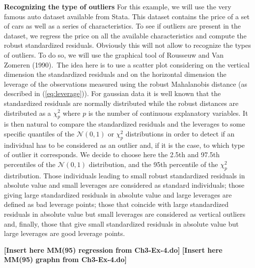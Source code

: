 \begin{stexample}
\textbf{Recognizing the type of outliers} For this example, we will use the
very famous auto dataset available from Stata. This dataset contains the price
of a set of cars as well as a series of characteristics. To see if outliers
are present in the dataset, we regress the price on all the available
characteristics and compute the robust standardized residuals. Obviously this
will not allow to recognize the types of outliers. To do so, we will use the
graphical tool of Rousseuw and Van Zomeren (1990).\ The idea here is to use a
scatter plot considering on the vertical dimension the standardized residuals
and on the horizontal dimension the leverage of the observations measured
using the robust Mahalanobis distance (as described in (\ref{eq:leverage})).
For gaussian data it is well known that the standardized residuals are
normally distributed while the robust distances are distributed as a $\chi
_{p}^{2}$ where $p$ is the number of continuous explanatory variables. It is
then natural to compare the standardized residuals and the leverages to some
specific quantiles of the $\mathcal{N}(0,1)$ or $\chi_{p}^{2}$ distributions
in order to detect if an individual has to be considered as an outlier and, if
it is the case, to which type of outlier it corresponds. We decide to choose
here the 2.5th and 97.5th percentiles of the $\mathcal{N}(0,1)$ distribution,
and the 95th percentile of the $\chi_{p}^{2}$ distribution. Those individuals
leading to small robust standardized residuals in absolute value and small
leverages are considered as standard individuals; those giving large
standardized residuals in absolute value and large leverages are defined as
bad leverage points; those that coincide with large standardized residuals in
absolute value but small leverages are considered as vertical outliers and,
finally, those that give small standardized residuals in absolute value but
large leverages are good leverage points. \newline

\textbf{[Insert here MM(95)
regression from Ch3-Ex-4.do]}  \newline\textbf{[Insert here MM(95) graphn from
Ch3-Ex-4.do]}\newline 


\end{stexample}
